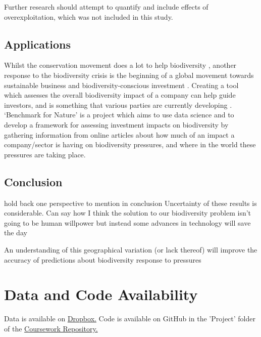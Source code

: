 \documentclass[11pt, a4paper, titlepage]{article}
\begin{document}
     
     Further research should attempt to quantify and include effects of overexploitation, which was not included in this study. 
     
    
         
    \subsection*{Applications} %
    Whilst the conservation movement does a lot to help biodiversity \citep{sandbrook2019global}, another response to the biodiversity crisis \citep{ogar2020science} is the beginning of a global movement towards sustainable business and biodiversity-conscious investment \citep{pri2020, worldeconomicforum2020, wwf2020}. Creating a tool which assesses the overall biodiversity impact of a company can help guide investors, and is something that various parties are currently developing \citep{worldbenchmarkingalliance_2022, iccs_2020}. `Benchmark for Nature' is a project which aims to use data science and to develop a framework for assessing investment impacts on biodiversity by gathering information from online articles about how much of an impact a company/sector is having on biodiversity pressures\citep{iccs_2020}, and where in the world these pressures are taking place. 
    \clearpage
    
    \subsection*{Conclusion}
    hold back one perspective to mention in conclusion
    Uncertainty of these results is considerable.
    Can say  how I think the solution to our biodiversity problem isn’t going to be human willpower but instead some advances in technology will save the day    
    
    An understanding of this geographical variation (or lack thereof) will improve the accuracy of predictions about biodiversity response to pressures %
    
    \section*{Data and Code Availability}
    Data is available on \href{https://www.dropbox.com/sh/pnoxzydwgmj4eaf/AABYpBAkeQJsY3yqGH8G8J86a?dl=0}{Dropbox.} 
    Code is available on GitHub in the 'Project' folder of the \href{https://github.com/kayleigh-greenwood/CMEECoursework.git}{Coursework Repository.}
    
\end{document}
